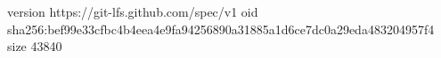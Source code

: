 version https://git-lfs.github.com/spec/v1
oid sha256:bef99e33cfbc4b4eea4e9fa94256890a31885a1d6ce7dc0a29eda483204957f4
size 43840

